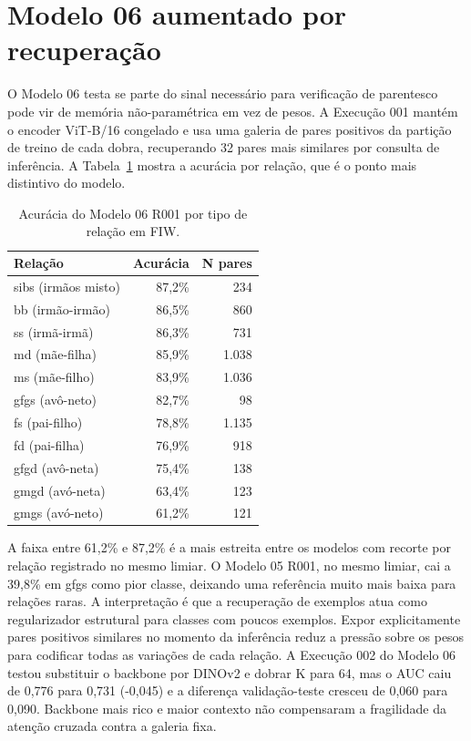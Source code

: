 \section{Modelo 06 aumentado por recuperação}

O Modelo 06 testa se parte do sinal necessário para verificação de parentesco pode vir de memória não-paramétrica em vez de pesos. A Execução 001 mantém o encoder ViT-B/16 congelado e usa uma galeria de pares positivos da partição de treino de cada dobra, recuperando 32 pares mais similares por consulta de inferência. A Tabela~\ref{tab:m06_per_rel} mostra a acurácia por relação, que é o ponto mais distintivo do modelo.

\begin{table}[h]
\centering
\caption{Acurácia do Modelo 06 R001 por tipo de relação em FIW.}
\label{tab:m06_per_rel}
\begin{tabular}{lrr}
\hline
\textbf{Relação} & \textbf{Acurácia} & \textbf{N pares} \\
\hline
sibs (irmãos misto)  & 87{,}2\% & 234 \\
bb (irmão-irmão)     & 86{,}5\% & 860 \\
ss (irmã-irmã)       & 86{,}3\% & 731 \\
md (mãe-filha)       & 85{,}9\% & 1.038 \\
ms (mãe-filho)       & 83{,}9\% & 1.036 \\
gfgs (avô-neto)      & 82{,}7\% & 98 \\
fs (pai-filho)       & 78{,}8\% & 1.135 \\
fd (pai-filha)       & 76{,}9\% & 918 \\
gfgd (avô-neta)      & 75{,}4\% & 138 \\
gmgd (avó-neta)      & 63{,}4\% & 123 \\
gmgs (avó-neto)      & 61{,}2\% & 121 \\
\hline
\end{tabular}
\end{table}

A faixa entre 61,2\% e 87,2\% é a mais estreita entre os modelos com recorte por relação registrado no mesmo limiar. O Modelo 05 R001, no mesmo limiar, cai a 39,8\% em gfgs como pior classe, deixando uma referência muito mais baixa para relações raras. A interpretação é que a recuperação de exemplos atua como regularizador estrutural para classes com poucos exemplos. Expor explicitamente pares positivos similares no momento da inferência reduz a pressão sobre os pesos para codificar todas as variações de cada relação. A Execução 002 do Modelo 06 testou substituir o backbone por DINOv2 e dobrar K para 64, mas o AUC caiu de 0,776 para 0,731 (-0,045) e a diferença validação-teste cresceu de 0,060 para 0,090. Backbone mais rico e maior contexto não compensaram a fragilidade da atenção cruzada contra a galeria fixa.

